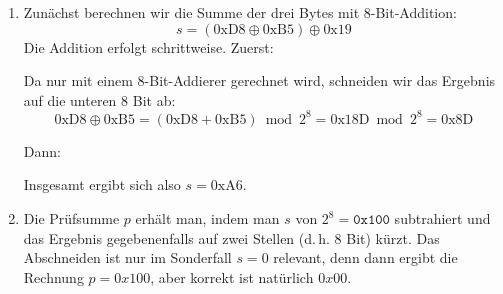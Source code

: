 \documentclass[a4paper,12pt]{article}
\begin{document}
\begin{enumerate}
    \item
	Zunächst berechnen wir die Summe der drei Bytes mit 8-Bit-Addition:
	\[
	    s = (\text{0xD8} \oplus \text{0xB5}) \oplus \text{0x19}
	\]
	Die Addition erfolgt schrittweise. Zuerst:
	\begin{center}
	\end{center}
	Da nur mit einem 8-Bit-Addierer gerechnet wird, schneiden wir das
	Ergebnis auf die unteren 8 Bit ab:
	\[
	    \text{0xD8} \oplus \text{0xB5}
	    = (\text{0xD8} + \text{0xB5}) \bmod 2^8
	    = \text{0x18D} \bmod 2^8 = \text{0x8D}
	\]

	Dann:
	\begin{center}
	\end{center}

	Insgesamt ergibt sich also $s = \text{0xA6}$.

    \item
	Die Prüfsumme $p$ erhält man, indem man $s$ von $2^8 = \texttt{0x100}$
	subtrahiert und das Ergebnis gegebenenfalls auf zwei Stellen (d.\,h. 8
	Bit) kürzt.  Das Abschneiden ist nur im Sonderfall $s = 0$ relevant,
	denn dann ergibt die Rechnung $p = 0x100$, aber korrekt ist natürlich
	$0x00$.

	\begin{center}
	\end{center}


\end{enumerate}
\end{document}

